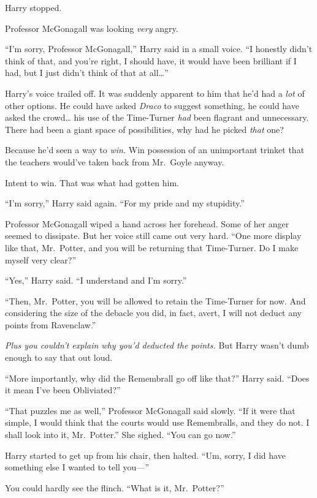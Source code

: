 Harry stopped.

Professor McGonagall was looking \emph{very} angry.

``I'm sorry, Professor McGonagall,'' Harry said in a small voice. ``I
honestly didn't think of that, and you're right, I should have, it would
have been brilliant if I had, but I just didn't think of that at
all\ldots{}''

Harry's voice trailed off. It was suddenly apparent to him that he'd had
a \emph{lot} of other options. He could have asked \emph{Draco} to
suggest something, he could have asked the crowd\ldots{} his use of the
Time-Turner \emph{had} been flagrant and unnecessary. There had been a
giant space of possibilities, why had he picked \emph{that} one?

Because he'd seen a way to \emph{win.} Win possession of an unimportant
trinket that the teachers would've taken back from Mr.~Goyle anyway.

Intent to win. That was what had gotten him.

``I'm sorry,'' Harry said again. ``For my pride and my stupidity.''

Professor McGonagall wiped a hand across her forehead. Some of her anger
seemed to dissipate. But her voice still came out very hard. ``One more
display like that, Mr.~Potter, and you will be returning that
Time-Turner. Do I make myself very clear?''

``Yes,'' Harry said. ``I understand and I'm sorry.''

``Then, Mr.~Potter, you will be allowed to retain the Time-Turner for
now. And considering the size of the debacle you did, in fact, avert, I
will not deduct any points from Ravenclaw.''

\emph{Plus you couldn't explain why you'd deducted the points.} But
Harry wasn't dumb enough to say that out loud.

``More importantly, why did the Remembrall go off like that?'' Harry
said. ``Does it mean I've been Obliviated?''

``That puzzles me as well,'' Professor McGonagall said slowly. ``If it
were that simple, I would think that the courts would use Remembralls,
and they do not. I shall look into it, Mr.~Potter.'' She sighed. ``You
can go now.''

Harry started to get up from his chair, then halted. ``Um, sorry, I did
have something else I wanted to tell you---''

You could hardly see the flinch. ``What is it, Mr.~Potter?''


